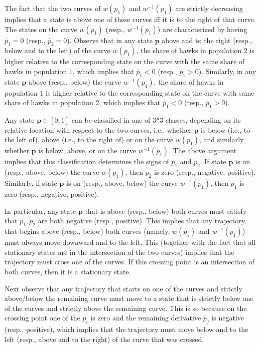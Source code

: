 \documentclass[12pt]{article}
\numberwithin{equation}{section}
\numberwithin{figure}{section}
\theoremstyle{definition}
\theoremstyle{plain}
\theoremstyle{plain}
\theoremstyle{plain}
\theoremstyle{remark}
\theoremstyle{plain}
\theoremstyle{plain}
\begin{document}
The fact that the two curves of $w(p_1)$ and $w^{-1}(p_1)$ are strictly decreasing implies that a state is above one of these curves iff it is to the right of that curve. The states on the curve $w(p_1)$ (resp., $w^{-1}(p_1)$) are characterized by having $\dot{p_1}=0$ (resp., $\dot{p_2}=0$). Observe that in any state $\textbf{p}$ above and to the right (resp., below and to the left) of the curve $w(p_1)$, the share of hawks in population 2 is higher relative to the corresponding state on the curve with the same share of hawks in population 1, which implies that $\dot{p_1}<0$ (resp., $\dot{p_1}>0$). Similarly, in any state $\textbf{p}$ above (resp., below) the curve $w^{-1}(p_1)$, the  share of hawks in population 1 is higher relative to the corresponding state on the curve with same share of hawks in population 2, which implies that $\dot{p_1}<0$ (resp., $\dot{p_1}>0$).

Any state $\textbf{p}\in[0,1]$ can be classified in one of 3*3 classes, depending on its relative location with respect to the two curves, i.e., whether $\textbf{p}$ is below (i.e., to the left of), above (i.e., to the right of) or on the curve $w(p_1)$, and similarly whether $\textbf{p}$ is below, above, or on the curve $w^{-1}(p_1)$. 
The above argument implies that this classification determines the signs of $\dot {p_1}$ and $\dot {p_2}$. If state $\textbf{p}$ is on (resp., above, below) the curve $w(p_1)$, then $\dot {p_2}$ is zero (resp., negative, positive). Similarly, if state $\textbf{p}$ is on (resp., above, below) the curve $w^{-1}(p_1)$, then $\dot {p_1}$ is zero (resp., negative, positive).

In particular, any state  $\textbf{p}$ that is above (resp., below) both curves must satisfy that $\dot {p_1},\dot {p_2}$ are both negative (resp., positive). This implies that any trajectory that begins  above (resp., below) both curves (namely, $w(p_1)$ and $w^{-1}(p_1)$) must always move downward and to the left. This (together with the fact that all stationary states are in the intersection of the two curves) implies  that the trajectory must cross one of the curves. If this crossing point is an intersection of both curves, then it is a stationary state.

Next observe that any trajectory that starts on one of the curves and strictly above/below the remaining curve must move to a state that is strictly below one of the curves and strictly above the remaining curve. This is so because on the crossing point one of the $\dot {p_i}$ is zero and the remaining derivative $\dot{p_j}$ is negative (resp., positive), which implies that the trajectory must move below and to the left (resp., above and to the right) of the curve that was crossed.
\end{document}
